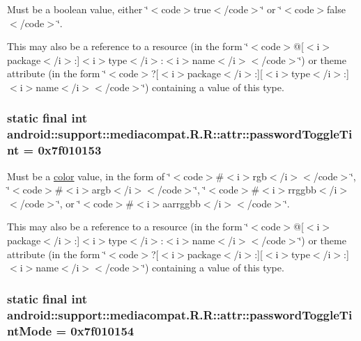 Must be a boolean value, either \char`\"{}$<$code$>$true$<$/code$>$\char`\"{} or \char`\"{}$<$code$>$false$<$/code$>$\char`\"{}. 

This may also be a reference to a resource (in the form \char`\"{}$<$code$>$@\mbox{[}$<$i$>$package$<$/i$>$:\mbox{]}$<$i$>$type$<$/i$>$:$<$i$>$name$<$/i$>$$<$/code$>$\char`\"{}) or theme attribute (in the form \char`\"{}$<$code$>$?\mbox{[}$<$i$>$package$<$/i$>$:\mbox{]}\mbox{[}$<$i$>$type$<$/i$>$:\mbox{]}$<$i$>$name$<$/i$>$$<$/code$>$\char`\"{}) containing a value of this type. \hypertarget{classandroid_1_1support_1_1mediacompat_1_1_r_1_1attr_c72578448c1110c4c782cae95a73edd5}{
\subsubsection[{passwordToggleTint}]{\setlength{\rightskip}{0pt plus 5cm}static final int android::support::mediacompat.R.R::attr::passwordToggleTint = 0x7f010153}}
\label{classandroid_1_1support_1_1mediacompat_1_1_r_1_1attr_c72578448c1110c4c782cae95a73edd5}


Must be a \hyperlink{classandroid_1_1support_1_1mediacompat_1_1_r_1_1color}{color} value, in the form of \char`\"{}$<$code$>$\#$<$i$>$rgb$<$/i$>$$<$/code$>$\char`\"{}, \char`\"{}$<$code$>$\#$<$i$>$argb$<$/i$>$$<$/code$>$\char`\"{}, \char`\"{}$<$code$>$\#$<$i$>$rrggbb$<$/i$>$$<$/code$>$\char`\"{}, or \char`\"{}$<$code$>$\#$<$i$>$aarrggbb$<$/i$>$$<$/code$>$\char`\"{}. 

This may also be a reference to a resource (in the form \char`\"{}$<$code$>$@\mbox{[}$<$i$>$package$<$/i$>$:\mbox{]}$<$i$>$type$<$/i$>$:$<$i$>$name$<$/i$>$$<$/code$>$\char`\"{}) or theme attribute (in the form \char`\"{}$<$code$>$?\mbox{[}$<$i$>$package$<$/i$>$:\mbox{]}\mbox{[}$<$i$>$type$<$/i$>$:\mbox{]}$<$i$>$name$<$/i$>$$<$/code$>$\char`\"{}) containing a value of this type. \hypertarget{classandroid_1_1support_1_1mediacompat_1_1_r_1_1attr_4db182a4bb703bdfc83fcb51931c409c}{
\subsubsection[{passwordToggleTintMode}]{\setlength{\rightskip}{0pt plus 5cm}static final int android::support::mediacompat.R.R::attr::passwordToggleTintMode = 0x7f010154}}
\label{classandroid_1_1support_1_1mediacompat_1_1_r_1_1attr_4db182a4bb703bdfc83fcb51931c409c}



